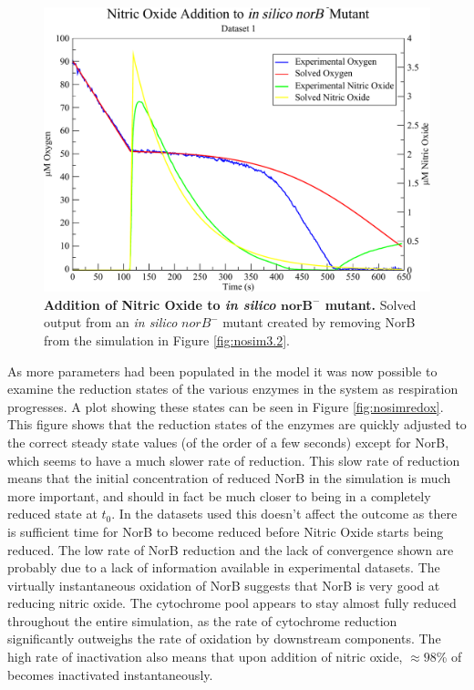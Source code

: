 \begin{figure}[tbp]
 \centering
 \includegraphics[width=15cm, clip=true]{./06-noreduction/data/in_silico_norB.pdf}
 \caption[{Addition of Nitric Oxide to \textit{in silico} norB mutant.}]{{\bf Addition of Nitric Oxide to \textit{in silico} $\mathbf{norB}^-$ mutant.} Solved output from an \textit{in silico} $norB^-$ mutant created by removing NorB from the simulation in Figure \ref{fig:nosim3.2}.
  \label{fig:in_silico_norB}}
\end{figure}

As more parameters had been populated in the model it was now possible to examine the reduction states of the various enzymes in the system as respiration progresses. A plot showing these states can be seen in Figure \ref{fig:nosimredox}. This figure shows that the reduction states of the enzymes are quickly adjusted to the correct steady state values (of the order of a few seconds) except for NorB, which seems to have a much slower rate of reduction. This slow rate of reduction means that the initial concentration of reduced NorB in the simulation is much more important, and should in fact be much closer to being in a completely reduced state at $t_0$. In the datasets used this doesn't affect the outcome as there is sufficient time for NorB to become reduced before Nitric Oxide starts being reduced. The low rate of NorB reduction and the lack of convergence shown are probably due to a lack of information available in experimental datasets. The virtually instantaneous oxidation of NorB suggests that NorB is 
very good at reducing nitric oxide. The cytochrome pool appears to stay almost fully reduced throughout the entire simulation, as the rate of cytochrome reduction significantly outweighs the rate of oxidation by downstream components. %
The high rate of \cbbthree{} inactivation also means that upon addition of nitric oxide, $\approx 98$\% of \cbbthree{} becomes inactivated instantaneously.

